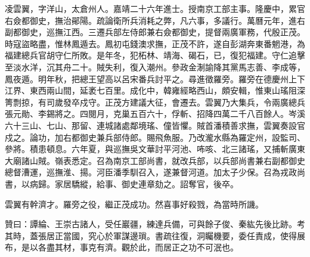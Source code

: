 \begin{pinyinscope}
凌雲翼，字洋山，太倉州人。嘉靖二十六年進士。授南京工部主事。隆慶中，累官右僉都御史，撫治鄖陽。疏論衛所兵消耗之弊，凡六事，多議行。萬曆元年，進右副都御史，巡撫江西。三遷兵部左侍郎兼右僉都御史，提督兩廣軍務，代殷正茂。時寇盜略盡，惟林鳳遁去。鳳初屯錢澳求撫，正茂不許，遂自彭湖奔東番魍港，為福建總兵官胡守仁所敗。是年冬，犯柘林、靖海、碣石，已，復犯福建。守仁追擊至淡水洋，沉其舟二十。賊失利，復入潮州。參政金淛諭降其黨馬志善、李成等，鳳夜遁。明年秋，把總王望高以呂宋番兵討平之。尋進徵羅旁。羅旁在德慶州上下江界、東西兩山間，延袤七百里。成化中，韓雍經略西山，頗安輯，惟東山瑤阻深箐剽掠，有司歲發卒戍守。正茂方建議大征，會遷去。雲翼乃大集兵，令兩廣總兵張元勛、李錫將之。四閱月，克巢五百六十，俘斬、招降四萬二千八百餘人。岑溪六十三山、七山、那留、連城諸處鄰境瑤、僮皆懼。賊首潘積善求撫，雲翼奏設官戍之。論功，加右都御史兼兵部侍郎。賜飛魚服。乃改瀧水縣為羅定州，設監司、參將。積患頓息。六年夏，與巡撫吳文華討平河池、咘咳、北三諸瑤，又捕斬廣東大廟諸山賊。嶺表悉定。召為南京工部尚書，就改兵部，以兵部尚書兼右副都御史總督漕運，巡撫淮、揚。河臣潘季馴召入，遂兼督河道。加太子少保。召為戎政尚書，以病歸。家居驕縱，給事、御史連章劾之。詔奪官，後卒。

雲翼有幹濟才。羅旁之役，繼正茂成功。然喜事好殺戮，為當時所譏。

贊曰：譚綸、王崇古諸人，受任巖疆，練達兵備，可與餘子俊、秦紘先後比跡。考其時，蓋張居正當國，究心於軍謀邊瑣。書疏往復，洞矚機要，委任責成，使得展布，是以各盡其材，事克有濟。觀於此，而居正之功不可泯也。


\end{pinyinscope}